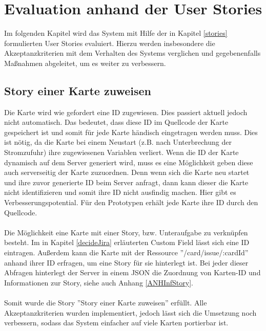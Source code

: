 \documentclass[12pt,titlepage]{scrartcl}
\begin{document}
	\section{Evaluation anhand der User Stories} \label{eval}
	Im folgenden Kapitel wird das System mit Hilfe der in Kapitel \ref{stories} formulierten User Stories evaluiert. Hierzu werden insbesondere die Akzeptanzkriterien mit dem Verhalten des Systems verglichen und gegebenenfalls Maßnahmen abgeleitet, um es weiter zu verbessern.
			\subsection{Story einer Karte zuweisen}
			Die Karte wird wie gefordert eine ID zugewiesen. Dies passiert aktuell jedoch nicht automatisch. Das bedeutet, dass diese ID im Quellcode der Karte gespeichert ist und somit für jede Karte händisch eingetragen werden muss. Dies ist nötig, da die Karte bei einem Neustart (z.B. nach Unterbrechung der Stromzufuhr) ihre zugewiesenen Variablen verliert. Wenn die ID der Karte dynamisch auf dem Server generiert wird, muss es eine Möglichkeit geben diese auch serverseitig der Karte zuzuordnen. Denn wenn sich die Karte neu startet und ihre zuvor generierte ID beim Server anfragt, dann kann dieser die Karte nicht identifizieren und somit ihre ID nicht ausfindig machen. Hier gibt es Verbesserungspotential. Für den Prototypen erhält jede Karte ihre ID durch den Quellcode. \\ \\
Die Möglichkeit eine Karte mit einer Story, bzw. Unteraufgabe zu verknüpfen besteht. Im in Kapitel \ref{decideJira} erläuterten Custom Field lässt sich eine ID eintragen. Außerdem kann die Karte mit der Ressource ''/card/issue/:cardId'' anhand ihrer ID erfragen, um eine Story für sie hinterlegt ist. Bei jeder dieser Abfragen hinterlegt der Server in einem JSON die Zuordnung von Karten-ID und Informationen zur Story, siehe auch Anhang \ref{ANHInfStory}. \\ \\
Somit wurde die Story ''Story einer Karte zuweisen'' erfüllt. Alle Akzeptanzkriterien wurden implementiert, jedoch lässt sich die Umsetzung noch verbessern, sodass das System einfacher auf viele Karten portierbar ist.
\end{document}
